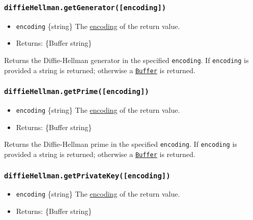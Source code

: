 \subsubsection{\texorpdfstring{\texttt{diffieHellman.getGenerator({[}encoding{]})}}{diffieHellman.getGenerator({[}encoding{]})}}\label{diffiehellman.getgeneratorencoding}

\begin{itemize}
\tightlist
\item
  \texttt{encoding} \{string\} The
  \href{buffer.md\#buffers-and-character-encodings}{encoding} of the
  return value.
\item
  Returns: \{Buffer \textbar{} string\}
\end{itemize}

Returns the Diffie-Hellman generator in the specified \texttt{encoding}.
If \texttt{encoding} is provided a string is returned; otherwise a
\href{buffer.md}{\texttt{Buffer}} is returned.

\subsubsection{\texorpdfstring{\texttt{diffieHellman.getPrime({[}encoding{]})}}{diffieHellman.getPrime({[}encoding{]})}}\label{diffiehellman.getprimeencoding}

\begin{itemize}
\tightlist
\item
  \texttt{encoding} \{string\} The
  \href{buffer.md\#buffers-and-character-encodings}{encoding} of the
  return value.
\item
  Returns: \{Buffer \textbar{} string\}
\end{itemize}

Returns the Diffie-Hellman prime in the specified \texttt{encoding}. If
\texttt{encoding} is provided a string is returned; otherwise a
\href{buffer.md}{\texttt{Buffer}} is returned.

\subsubsection{\texorpdfstring{\texttt{diffieHellman.getPrivateKey({[}encoding{]})}}{diffieHellman.getPrivateKey({[}encoding{]})}}\label{diffiehellman.getprivatekeyencoding}

\begin{itemize}
\tightlist
\item
  \texttt{encoding} \{string\} The
  \href{buffer.md\#buffers-and-character-encodings}{encoding} of the
  return value.
\item
  Returns: \{Buffer \textbar{} string\}
\end{itemize}

